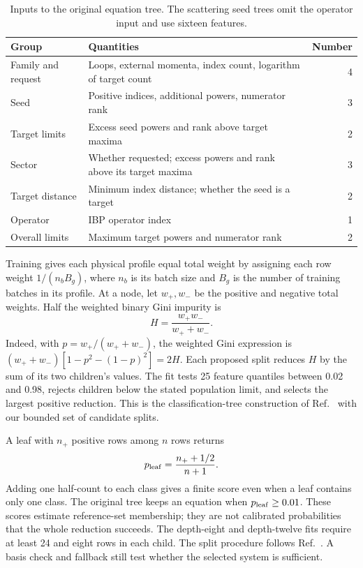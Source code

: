 \begin{table}[!htbp]
\centering\small
\caption{Inputs to the original equation tree. The scattering seed trees omit the operator input and use sixteen features.}
\label{tab:features}
\begin{tabularx}{\linewidth}{@{}lYr@{}}\toprule
Group & Quantities & Number\\\midrule
Family and request & Loops, external momenta, index count, logarithm of target count & 4\\
Seed & Positive indices, additional powers, numerator rank & 3\\
Target limits & Excess seed powers and rank above target maxima & 2\\
Sector & Whether requested; excess powers and rank above its target maxima & 3\\
Target distance & Minimum index distance; whether the seed is a target & 2\\
Operator & IBP operator index & 1\\
Overall limits & Maximum target powers and numerator rank & 2\\\bottomrule
\end{tabularx}
\end{table}

Training gives each physical profile equal total weight by assigning each row weight $1/(n_b B_g)$, where $n_b$ is its batch size and $B_g$ is the number of training batches in its profile. At a node, let $w_+,w_-$ be the positive and negative total weights. Half the weighted binary Gini impurity is
\begin{equation}
 H=\frac{w_+w_-}{w_++w_-}.
\end{equation}
Indeed, with $p=w_+/(w_++w_-)$, the weighted Gini expression is $(w_++w_-)[1-p^2-(1-p)^2]=2H$. Each proposed split reduces $H$ by the sum of its two children's values. The fit tests 25 feature quantiles between 0.02 and 0.98, rejects children below the stated population limit, and selects the largest positive reduction. This is the classification-tree construction of Ref.~\cite{CART1984} with our bounded set of candidate splits.

A leaf with $n_+$ positive rows among $n$ rows returns
\begin{equation}
 p_{\rm leaf}=\frac{n_++1/2}{n+1}.
\end{equation}
Adding one half-count to each class gives a finite score even when a leaf contains only one class. The original tree keeps an equation when $p_{\rm leaf}\geq0.01$. These scores estimate reference-set membership; they are not calibrated probabilities that the whole reduction succeeds. The depth-eight and depth-twelve fits require at least 24 and eight rows in each child. The split procedure follows Ref.~\cite{CART1984}. A basis check and fallback still test whether the selected system is sufficient.

